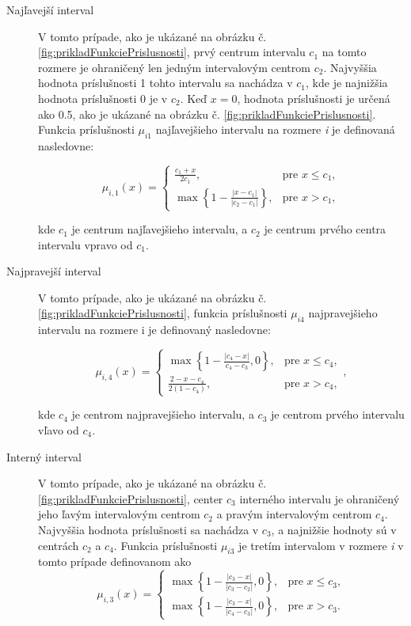 \begin{description}
\item[Najľavejší interval] 

V tomto prípade, ako je ukázané na obrázku č. \ref{fig:prikladFunkciePrislusnosti}, prvý centrum intervalu $c_1$ na tomto rozmere je ohraničený len jedným intervalovým centrom $c_2$. Najvyššia hodnota príslušnosti 1 tohto intervalu sa nachádza v $c_1$, kde je najnižšia hodnota príslušnosti 0 je v $c_2$. Keď $x=0$, hodnota príslušnosti je určená ako 0.5, ako je ukázané na obrázku č. \ref{fig:prikladFunkciePrislusnosti}. Funkcia príslušnosti $\mu_{i1}$ najľavejšieho intervalu na rozmere \textit{i} je definovaná nasledovne:  

$$
\mu_{i, 1}(x) = 
\begin{cases}
{\frac{c_1 + x}{2c_1}, } &  \textrm{pre } x \leq   c_1 ,
\\
\max\left\{1 -\frac{| x-c_1|}{ | c_2 - c_1 |} \right\},
&  \textrm{pre } x >  c_1, \end{cases}
$$

kde $c_1$ je centrum najľavejšieho intervalu, a $c_2$ je centrum prvého centra intervalu vpravo od $c_1$. 

\item[Najpravejší interval ]
V tomto prípade, ako je ukázané na obrázku  č. \ref{fig:prikladFunkciePrislusnosti}, funkcia príslušnosti $\mu_{i4}$ najpravejšieho intervalu na rozmere i je definovaný nasledovne:

\begin{displaymath}
\mu_{i, 4}(x) = 
\begin{cases} 
\max \left\{
1 -\frac{| c_4-x|}{c_4-c_3} , 0
\right\}, 
& \textrm{pre } x \leq   c_4 ,
\\ 
\frac{2- x - c_4 }{2(1-c_4)}, 
& \textrm{pre } x >   c_4 ,
  \end{cases}, 
\end{displaymath}

kde $c_4$ je centrom najpravejšieho intervalu, a $c_3$ je centrom prvého intervalu vľavo od $c_4$. 


\item[Interný interval]
V tomto prípade, ako je ukázané na obrázku  č. \ref{fig:prikladFunkciePrislusnosti}, center $c_3$ interného intervalu je ohraničený jeho ľavým intervalovým centrom $c_2$ a pravým intervalovým centrom $c_4$. Najvyššia hodnota príslušnosti sa nachádza v $c_3$, a najnižšie hodnoty sú v centrách $c_2$ a $c_4$. Funkcia príslušnosti $\mu_{i3}$ je tretím intervalom v rozmere \textit{i} v tomto prípade definovanom ako  
$$
\mu_{i, 3}(x) = 
\begin{cases}
\max \left\{
1 -\frac{| c_3-x|}{|c_3-c_2|} , 0
\right\}, 
& \textrm{pre } x \leq   c_3,
\\
\max \left\{
1 -\frac{| c_3-x|}{|c_4-c_3|} , 0
\right\}, 
& \textrm{pre } x >  c_3.
\end{cases} 
$$

\end{description}


